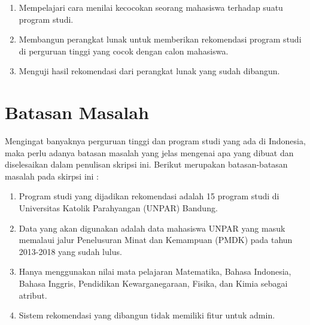\begin{enumerate}
	\item Mempelajari cara menilai kecocokan seorang mahasiswa terhadap suatu program studi.
	
	\item Membangun perangkat lunak untuk memberikan rekomendasi program studi di perguruan tinggi yang cocok dengan calon mahasiswa.
	
	\item Menguji hasil rekomendasi dari perangkat lunak yang sudah dibangun.
\end{enumerate}


\section{Batasan Masalah}
\label{sec:batasan masalah}

Mengingat banyaknya perguruan tinggi dan program studi yang ada di Indonesia, maka perlu adanya batasan masalah yang jelas mengenai apa yang dibuat dan diselesaikan dalam penulisan skripsi ini. Berikut merupakan batasan-batasan masalah pada skirpsi ini : 

	\begin{enumerate}
		\item Program studi yang dijadikan rekomendasi adalah 15 program studi di Universitas Katolik Parahyangan (UNPAR) Bandung.
		
		\item Data yang akan digunakan adalah data mahasiswa UNPAR yang masuk memalaui jalur Penelusuran Minat dan Kemampuan (PMDK) pada tahun 2013-2018 yang sudah lulus.
		
		\item Hanya menggunakan nilai mata pelajaran Matematika, Bahasa Indonesia, Bahasa Inggris, Pendidikan Kewarganegaraan, Fisika, dan Kimia sebagai atribut.
		
		\item Sistem rekomendasi yang dibangun tidak memiliki fitur untuk admin.
	\end{enumerate}

